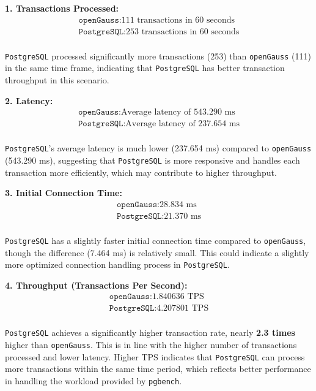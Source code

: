 \documentclass[12pt,a4paper,cs4size]{ctexart}
\begin{document}
\vspace{0.5cm}

\textbf{1. Transactions Processed:}
\[
\begin{aligned}
    \texttt{openGauss}:\text{111 transactions in 60 seconds}\\
    \texttt{PostgreSQL}: \text{253 transactions in 60 seconds}\\
\end{aligned}
\]

\texttt{PostgreSQL} processed significantly more transactions (253) than \texttt{openGauss} (111) in the same time frame, indicating that \texttt{PostgreSQL} has better transaction throughput in this scenario.

\textbf{2. Latency:}
\[
\begin{aligned}
    \texttt{openGauss}:\text{Average latency of 543.290 ms}\\
    \texttt{PostgreSQL}: \text{Average latency of 237.654 ms}\\
\end{aligned}
\]

\texttt{PostgreSQL}'s average latency is much lower (237.654 ms) compared to \texttt{openGauss} (543.290 ms), suggesting that \texttt{PostgreSQL} is more responsive and handles each transaction more efficiently, which may contribute to higher throughput.

\textbf{3. Initial Connection Time:}
\[
\begin{aligned}
    \texttt{openGauss}:\text{28.834 ms}\\
    \texttt{PostgreSQL}: \text{21.370 ms}\\
\end{aligned}
\]

\texttt{PostgreSQL} has a slightly faster initial connection time compared to \texttt{openGauss}, though the difference (7.464 ms) is relatively small. This could indicate a slightly more optimized connection handling process in \texttt{PostgreSQL}.

\textbf{4. Throughput (Transactions Per Second):}
\[
\begin{aligned}
    \texttt{openGauss}:\text{1.840636 TPS}\\
    \texttt{PostgreSQL}: \text{4.207801 TPS}\\
\end{aligned}
\]

\texttt{PostgreSQL} achieves a significantly higher transaction rate, nearly \textbf{2.3 times} higher than \texttt{openGauss}. This is in line with the higher number of transactions processed and lower latency. Higher TPS indicates that \texttt{PostgreSQL} can process more transactions within the same time period, which reflects better performance in handling the workload provided by \texttt{pgbench}.
\end{document}
